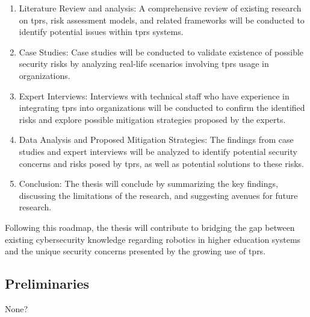 \begin{enumerate}
  \item Literature Review and analysis: A comprehensive review of existing research on \ac{tprs}, risk assessment models, and related
  frameworks will be conducted to identify potential issues within \ac{tprs} systems.
  \item Case Studies: Case studies will be conducted to validate existence of possible security risks by analyzing real-life scenarios
  involving \ac{tprs} usage in organizations.
  \item Expert Interviews: Interviews with technical staff who have experience in integrating \ac{tprs} into organizations will be conducted to confirm the identified risks and explore possible mitigation strategies proposed by the experts.
  \item Data Analysis and Proposed Mitigation Strategies: The findings from case studies and expert interviews will be analyzed to identify potential security concerns and risks posed by \ac{tprs}, as well as potential solutions to these risks.
  \item Conclusion: The thesis will conclude by summarizing the key findings, discussing the limitations of the research, and suggesting avenues for future research.
\end{enumerate}
Following this roadmap, the thesis will contribute to bridging the gap between existing cybersecurity knowledge regarding robotics in
higher education systems and the unique security concerns presented by the growing use of \ac{tprs}.



\subsection{Preliminaries}

None?

